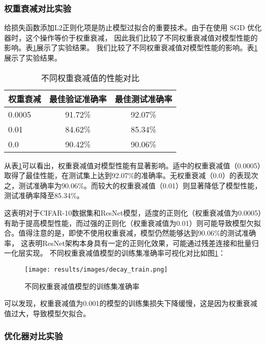 \documentclass[12pt,a4paper]{article}
\begin{document}
\subsubsection{权重衰减对比实验}

给损失函数添加L2正则化项是防止模型过拟合的重要技术。由于在使用 SGD 优化器时，这个操作等价于权重衰减，
因此我们比较了不同权重衰减值对模型性能的影响。表\ref{tab:weight_decay}展示了实验结果。
我们比较了不同权重衰减值对模型性能的影响。表\ref{tab:weight_decay}展示了实验结果。

\begin{table}[htbp]
\centering
\caption{不同权重衰减值的性能对比}
\label{tab:weight_decay}
\begin{tabular}{lcc}
\toprule
\textbf{权重衰减} & \textbf{最佳验证准确率} & \textbf{最佳测试准确率} \\
\midrule
0.0005 & 91.72\% & 92.07\% \\
0.01 & 84.62\% & 85.34\% \\
0.0 & 90.42\% & 90.06\% \\
\bottomrule
\end{tabular}
\end{table}

从表\ref{tab:weight_decay}可以看出，权重衰减值对模型性能有显著影响。适中的权重衰减值（0.0005）取得了最佳性能，在测试集上达到92.07\%的准确率。无权重衰减（0.0）的表现次之，测试准确率为90.06\%。而较大的权重衰减值（0.01）则显著降低了模型性能，测试准确率降至85.34\%。

这表明对于CIFAR-10数据集和ResNet模型，适度的正则化（权重衰减值为0.0005）有助于提高模型性能，而过强的正则化（权重衰减值为0.01）则可能导致模型欠拟合。值得注意的是，即使不使用权重衰减，模型仍然能够达到90.06\%的测试准确率，
这表明ResNet架构本身具有一定的正则化效果，可能通过残差连接和批量归一化层实现。
不同权重衰减值模型的训练集准确率可视化对比如图\ref{fig:decay_train}：
\begin{figure}[htbp]
    \centering
    \texttt{[image: results/images/decay\_train.png]}
\caption{不同权重衰减值模型的训练集准确率}
    \label{fig:decay_train}
\end{figure}

可以发现，权重衰减值为0.001的模型的训练集损失下降缓慢，这是因为权重衰减值过大，导致模型欠拟合。


\subsubsection{优化器对比实验}
\end{document}
